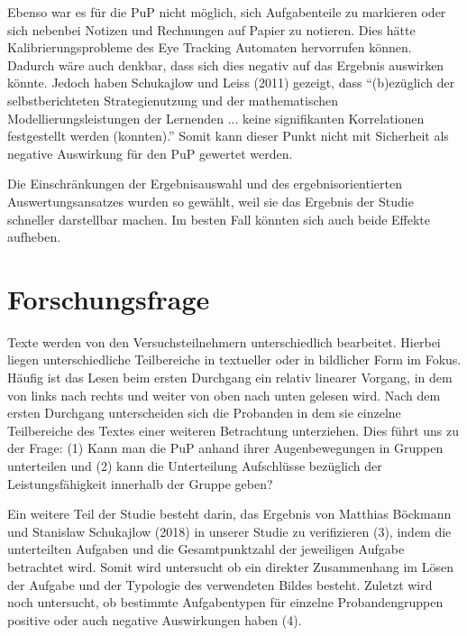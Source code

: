 Ebenso war es für die \gls{PuP} nicht möglich, sich Aufgabenteile zu markieren oder sich nebenbei Notizen und Rechnungen auf Papier zu notieren. Dies hätte Kalibrierungsprobleme des Eye Tracking Automaten hervorrufen können. Dadurch wäre auch denkbar, dass sich dies negativ auf das Ergebnis auswirken könnte. Jedoch haben Schukajlow und Leiss (2011) gezeigt, dass ``(b)ezüglich der selbstberichteten Strategienutzung und der mathematischen Modellierungsleistungen der Lernenden ... keine signifikanten Korrelationen festgestellt werden\cite{schukajlow2011selbstberichtete} (konnten).'' Somit kann dieser Punkt nicht mit Sicherheit als negative Auswirkung für den \gls{PuP} gewertet werden. 

Die Einschränkungen der Ergebnisauswahl und des ergebnisorientierten Auswertungsansatzes wurden so gewählt, weil sie das Ergebnis der Studie schneller darstellbar machen. Im besten Fall könnten sich auch beide Effekte aufheben.
\section{Forschungsfrage}

Texte werden von den Versuchsteilnehmern unterschiedlich bearbeitet. Hierbei liegen unterschiedliche Teilbereiche in textueller oder in bildlicher Form im Fokus. Häufig ist das Lesen beim ersten Durchgang ein relativ linearer Vorgang, in dem von links nach rechts und weiter von oben nach unten gelesen wird. Nach dem ersten Durchgang unterscheiden sich die Probanden in dem sie einzelne Teilbereiche des Textes einer weiteren Betrachtung unterziehen. Dies führt uns zu der Frage:
(1) Kann man die \gls{PuP} anhand ihrer Augenbewegungen in Gruppen unterteilen und (2) kann die Unterteilung Aufschlüsse bezüglich der Leistungsfähigkeit innerhalb der Gruppe geben?

Ein weitere Teil der Studie besteht darin, das Ergebnis von Matthias Böckmann und Stanislaw Schukajlow (2018)\cite{bockmannvalue} in unserer Studie zu verifizieren (3), indem die unterteilten Aufgaben und die Gesamtpunktzahl der jeweiligen Aufgabe betrachtet wird. Somit wird untersucht ob ein direkter Zusammenhang im Lösen der Aufgabe und der Typologie des verwendeten Bildes besteht. Zuletzt wird noch untersucht, ob bestimmte Aufgabentypen für einzelne Probandengruppen positive oder auch negative Auswirkungen haben (4).